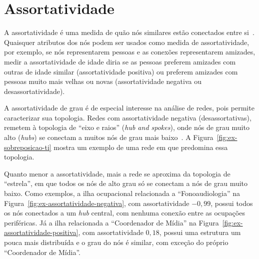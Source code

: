 \documentclass[
  article,
  11pt,
  a4paper,
  english,
  brazil,
  sumario=tradicional]{abntex2}
\begin{document}
\section{Assortatividade} \label{sec:assortatividade}

A assortatividade é uma medida de quão nós similares estão conectados entre si~\cite{Newman2003-jn}. Quaisquer atributos dos nós podem ser usados como medida de assortatividade, por exemplo, se nós representarem pessoas e as conexões representarem amizades, medir a assortatividade de idade diria se as pessoas preferem amizades com outras de idade similar (assortatividade positiva) ou preferem amizades com pessoas muito mais velhas ou novas (assortatividade negativa ou desassortatividade).

A assortatividade de grau é de especial interesse na análise de redes, pois permite caracterizar sua topologia. Redes com assortatividade negativa (desassortativas), remetem à topologia de \enquote{eixo e raios} (\textit{hub and spokes}), onde nós de grau muito alto (\textit{hubs}) se conectam a muitos nós de grau mais baixo~\cite{Barabasi2016-rn}. A Figura~\ref{fig:ex-sobreposicao-ti} mostra um exemplo de uma rede em que predomina essa topologia.

Quanto menor a assortatividade, mais a rede se aproxima da topologia de \enquote{estrela}, em que todos os nós de alto grau só se conectam a nós de grau muito baixo. Como exemplos, a ilha ocupacional relacionada a \enquote{Fonoaudiologia} na Figura~\ref{fig:ex-assortatividade-negativa}, com assortatividade $-0,99$, possui todos os nós conectados a um \textit{hub} central, com nenhuma conexão entre as ocupações periféricas. Já a ilha relacionada a \enquote{Coordenador de Mídia} na Figura~\ref{fig:ex-assortatividade-positiva}, com assortatividade $0,18$, possui uma estrutura um pouca mais distribuída e o grau do nós é similar, com exceção do próprio \enquote{Coordenador de Mídia}.
\end{document}
